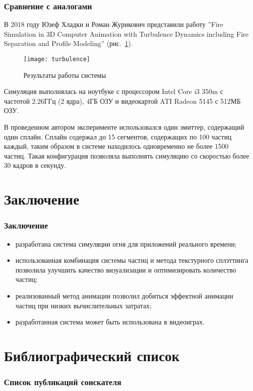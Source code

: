 \begin{frame}[allowframebreaks]
\frametitle{Сравнение с аналогами}
В 2018 году Юзеф Хладки и Роман Журикович представили работу ''Fire Simulation
in 3D Computer Animation with Turbulence Dynamics including Fire Separation and
Profile Modeling'' (рис.~\ref{fig:turbulence}).
\begin{figure}[htb]
	\centering
    \texttt{[image: turbulence]}
    \caption{Результаты работы системы}%
    \label{fig:turbulence}
\end{figure}

Симуляция выполнялась на ноутбуке с процессором Intel Core i3 350m с частотой
2.26ГГц (2 ядра), 4ГБ ОЗУ и видеокартой ATI Radeon 5145 с 512МБ ОЗУ.

В проведенном автором эксперименте использовался один эмиттер, содержащий один
сплайн. Сплайн содержал до 15 сегментов, содержащих по 100 частиц каждый, таким
образом в системе находилось одновременно не более 1500 частиц. Такая
конфигурация позволяла выполнять симуляцию со скоростью более 30 кадров в
секунду.
\end{frame}

\section{Заключение}
\begin{frame}
\frametitle{Заключение}
\begin{itemize}
    \item разработана система симуляции огня для приложений реального времени;
    \item использованная комбинация системы частиц и метода текстурного
        сплэттинга позволила улучшить качество визуализации и оптимизировать
        количество частиц;
    \item реализованный метод анимации позволил добиться эффектной анимации
        частиц при низких вычислительных затратах;
    \item разработанная система может быть использована в видеоиграх.
\end{itemize}
\end{frame}

\section{Библиографический список}
\begin{frame}[t,allowframebreaks]
\frametitle{Список публикаций соискателя}
\nocite{*}
\sloppy\printbibliography[
    category=AuthorSources,
    heading=none,
    resetnumbers,
]
\end{frame}
